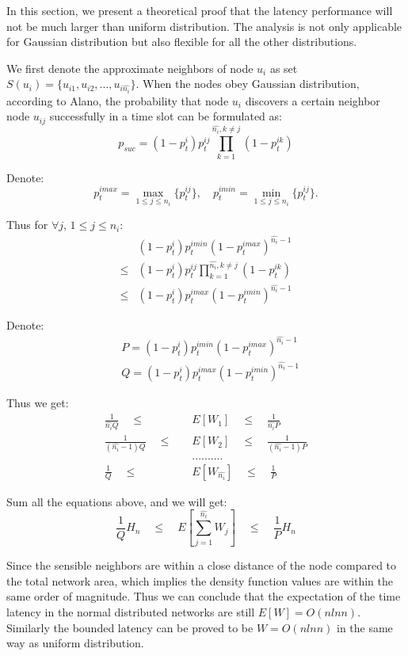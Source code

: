 In this section, we present a theoretical proof that the latency performance
will not be much larger than uniform distribution.
The analysis is not only applicable for Gaussian distribution
but also flexible for all the other distributions.

We first denote the approximate neighbors of node $u_i$
as set $S(u_i) = \{u_{i1},u_{i2},...,u_{i\hat{n_i}}\}$.
When the nodes obey Gaussian distribution, according to Alano, 
the probability that node $u_i$ discovers a certain 
neighbor node $u_{ij}$ successfully in a time slot can be formulated as:
$$
p_{suc} = (1-p_t^i)p_t^{ij}\prod_{ k=1}^{\hat{n_i}, k\neq j}(1-p_t^{ik})
$$

Denote:
$$
p_t^{imax} = \max_{1 \leq j \leq n_i}\{p_t^{ij}\}, \quad p_t^{imin} = \min_{1 \leq j \leq n_i}\{p_t^{ij}\}.
$$

Thus for $\forall j$, $1 \leq j \leq n_i$:
\begin{align*}
&(1-p_t^i)p_t^{imin}{(1-p_t^{imax})}^{\hat{n_i}-1} \\
\leq &(1-p_t^i)p_t^{ij}\prod_{ k=1}^{\hat{n_i}, k\neq j}(1-p_t^{ik}) \\
\leq &(1-p_t^i)p_t^{imax}{(1-p_t^{imin})}^{\hat{n_i}-1} 
\end{align*}

Denote:
\begin{align*}
&P = (1-p_t^i)p_t^{imin}{(1-p_t^{imax})}^{\hat{n_i}-1}  \\
&Q = (1-p_t^i)p_t^{imax}{(1-p_t^{imin})}^{\hat{n_i}-1} 
\end{align*}

Thus we get:
\begin{align*}
\frac{1}{\hat{n_i}Q} \quad \leq \quad &E[W_1] \quad \leq \quad \frac{1}{\hat{n_i}P} \\
\frac{1}{(\hat{n_i}-1)Q} \quad \leq \quad &E[W_2] \quad \leq \quad \frac{1}{(\hat{n_i}-1)P} \\
& ..........\\
\frac{1}{Q} \quad \leq \quad &E[W_{\hat{n_i}}] \quad \leq \quad \frac{1}{P} 
\end{align*}

Sum all the equations above, and we will get:
$$
\frac{1}{Q}H_n  \quad \leq \quad E[\sum_{j=1}^{\hat{n_i}}W_j]  \quad \leq \quad \frac{1}{P}H_n
$$

Since the sensible neighbors are within a close distance of the node 
compared to the total network area, 
which implies the density function values are within the same order of magnitude.
Thus we can conclude that the expectation of the time latency in the normal 
distributed networks are still $E[W]=O(nlnn)$.
Similarly the bounded latency can be proved to be $W=O(nlnn)$ in the same way as
uniform distribution.



